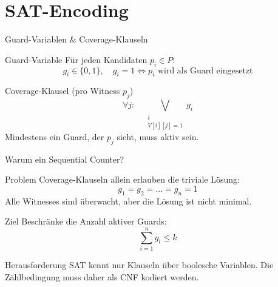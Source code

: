 \documentclass[11pt,aspectratio=169]{beamer}
\newcommand{\guard}[1]{g_{#1}}
\begin{document}
\section{SAT-Encoding}

\begin{frame}{Guard-Variablen \& Coverage-Klauseln}
  \begin{block}{Guard-Variable}
    Für jeden Kandidaten $p_i \in P$:
    \[
      \guard{i} \in \{0,1\}, \quad
      \guard{i}=1 \iff p_i \text{ wird als Guard eingesetzt}
    \]
  \end{block}
  \vspace{0.3em}
  \begin{block}{Coverage-Klausel (pro Witness $p_j$)}
    \[
      \forall j:\quad \bigvee_{\substack{i \\ V[i][j]=1}} \guard{i}
    \]
    Mindestens ein Guard, der $p_j$ sieht, muss aktiv sein.
  \end{block}
\end{frame}

\begin{frame}{Warum ein Sequential Counter?}

\begin{block}{Problem}
Coverage-Klauseln allein erlauben die triviale Lösung:
\[
g_1 = g_2 = \dots = g_n = 1
\]
Alle Witnesses sind überwacht, aber die Lösung ist nicht minimal.
\end{block}
\vspace{0.4em}
\begin{block}{Ziel}
Beschränke die Anzahl aktiver Guards:
\[
\sum_{i=1}^{n} g_i \le k
\]
\end{block}
\vspace{0.4em}
\begin{alertblock}{Herausforderung}
SAT kennt nur Klauseln über boolesche Variablen.
Die Zählbedingung muss daher als CNF kodiert werden.
\end{alertblock}
\end{frame}
\end{document}
